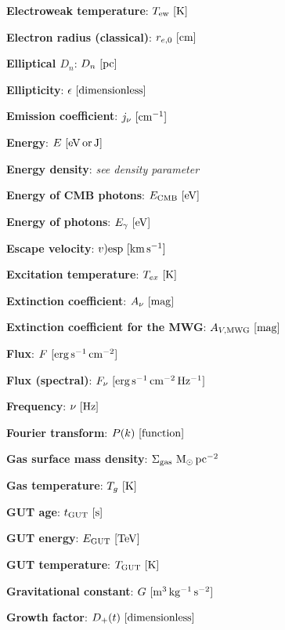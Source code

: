 \documentclass[a4paper,11pt]{article}
\begin{document}
{\noindent}\textbf{Electroweak temperature}: $T_\mathrm{ew} ~ [{\rm K}]$

{\noindent}\textbf{Electron radius (classical)}: $r_{e,0} ~ [{\rm cm}]$

{\noindent}\textbf{Elliptical $D_n$}: $D_n ~ [{\rm pc}]$

{\noindent}\textbf{Ellipticity}: $\epsilon ~ [{\rm dimensionless}]$

{\noindent}\textbf{Emission coefficient}: $j_\nu ~ [{\rm cm^{-1}}]$

{\noindent}\textbf{Energy}: $E ~ [{\rm eV\,or\,J}]$

{\noindent}\textbf{Energy density}: \textit{see density parameter}

{\noindent}\textbf{Energy of CMB photons}: $E_\mathrm{CMB} ~ [{\rm eV}]$

{\noindent}\textbf{Energy of photons}: $E_\gamma ~ [{\rm eV}]$

{\noindent}\textbf{Escape velocity}: $v)\mathrm{esp} ~ [{\rm km\,s^{-1}}]$

{\noindent}\textbf{Excitation temperature}: $T_{ex} ~ [{\rm K}]$

{\noindent}\textbf{Extinction coefficient}: $A_\nu ~ [{\rm mag}]$

{\noindent}\textbf{Extinction coefficient for the MWG}: $A_{V,\mathrm{MWG}} ~ [{\rm mag}]$

{\noindent}\textbf{Flux}: $F ~ [{\rm erg\,s^{-1}\,cm^{-2}}]$

{\noindent}\textbf{Flux (spectral)}: $F_\nu ~ [{\rm erg\,s^{-1}\,cm^{-2}\,Hz^{-1}}]$

{\noindent}\textbf{Frequency}: $\nu ~ [{\rm Hz}]$

{\noindent}\textbf{Fourier transform}: $P(k) ~ [{\rm function}]$

{\noindent}\textbf{Gas surface mass density}: $\Sigma_\mathrm{gas} ~ {\rm M_\odot\,pc^{-2}}$

{\noindent}\textbf{Gas temperature}: $T_g ~ [{\rm K}]$

{\noindent}\textbf{GUT age}: $t_\mathrm{GUT} ~ [{\rm s}]$

{\noindent}\textbf{GUT energy}: $E_\mathrm{GUT} ~ [{\rm TeV}]$

{\noindent}\textbf{GUT temperature}: $T_\mathrm{GUT} ~ [{\rm K}]$

{\noindent}\textbf{Gravitational constant}: $G ~ [{\rm m^3\,kg^{-1}\,s^{-2}}]$

{\noindent}\textbf{Growth factor}: $D_+(t) ~ [{\rm dimensionless}]$
\end{document}
